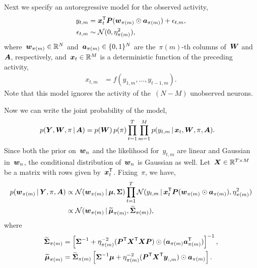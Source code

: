 Next we specify an autoregressive model for the observed activity,
\begin{align*}
  y_{t,m} &= \boldsymbol{x}_t^{\mathsf{T}} \boldsymbol{P} (\boldsymbol{w}_{\pi(m)} \odot \boldsymbol{a}_{\pi(m)})  + \epsilon_{t,m}, \\
  \epsilon_{t,m} &\sim \mathcal{N}(0, \eta_{\pi(m)}^2),
\end{align*}
where~$\boldsymbol{w}_{\pi(m)} \in \mathbb{R}^N$ and~$\boldsymbol{a}_{\pi(m)} \in \{0,1\}^N$ are the~$\pi(m)$-th
columns of~$\boldsymbol{W}$ and~$\boldsymbol{A}$, respectively,
and~$\boldsymbol{x}_t \in \mathbb{R}^M$ is a deterministic function of the
preceding activity,
\begin{align*}
  x_{t,m} &= f(y_{1,m}, \ldots, y_{t-1,m}).
\end{align*}
Note that this model ignores the activity of the~$(N-M)$ unobserved
neurons. 

Now we can write the joint probability of the model,
\begin{align*}
  p(\boldsymbol{Y}, \boldsymbol{W}, \pi \, | \, \boldsymbol{A}) &=
    p(\boldsymbol{W}) \, p(\pi) \prod_{t=1}^T \prod_{m=1}^M p(y_{t,m} \, | \, \boldsymbol{x}_t, \boldsymbol{W}, \pi, \boldsymbol{A}).
\end{align*}
Since both the prior on~$\boldsymbol{w}_n$ and the likelihood for~$y_{t,m}$ are
linear and Gaussian in~$\boldsymbol{w}_n$, the conditional distribution of~$\boldsymbol{w}_n$
is Gaussian as well. Let~$\boldsymbol{X} \in \mathbb{R}^{T \times M}$ be a matrix with
rows given by~$\boldsymbol{x}_t^{\mathsf{T}}$. Fixing~$\pi$, we have,
\begin{align*}
  p(\boldsymbol{w}_{\pi(m)} \, | \, \boldsymbol{Y}, \pi, \boldsymbol{A}) &\propto \mathcal{N}(\boldsymbol{w}_{\pi(m)} \, | \, \boldsymbol{\mu}, \boldsymbol{\Sigma}) \prod_{t=1}^T \mathcal{N}(y_{t,m} \, | \, \boldsymbol{x}_t^{\mathsf{T}} \boldsymbol{P} (\boldsymbol{w}_{\pi(m)} \odot \boldsymbol{a}_{\pi(m)}), \eta_{\pi(m)}^2) \\
  &\propto \mathcal{N}(\boldsymbol{w}_{\pi(m)} \, | \, \widetilde{\boldsymbol{\mu}}_{\pi(m)}, \widetilde{\boldsymbol{\Sigma}}_{\pi(m)}),
\end{align*}
where
\begin{align*}
  \widetilde{\boldsymbol{\Sigma}}_{\pi(m)} &= \left[ \boldsymbol{\Sigma}^{-1} + \eta_{\pi(m)}^{-2} (\boldsymbol{P}^{\mathsf{T}} \boldsymbol{X}^{\mathsf{T}} \boldsymbol{X} \boldsymbol{P}) \odot (\boldsymbol{a}_{\pi(m)} \boldsymbol{a}_{\pi(m)}^{\mathsf{T}} ) \right]^{-1}, \\
  \widetilde{\boldsymbol{\mu}}_{\pi(m)} &= \widetilde{\boldsymbol{\Sigma}}_{\pi(m)} \left[\boldsymbol{\Sigma}^{-1} \boldsymbol{\mu} + \eta_{\pi(m)}^{-2} (\boldsymbol{P}^{\mathsf{T}} \boldsymbol{X}^{\mathsf{T}} \boldsymbol{y}_{:,m}) \odot \boldsymbol{a}_{\pi(m)} \right].
\end{align*}


